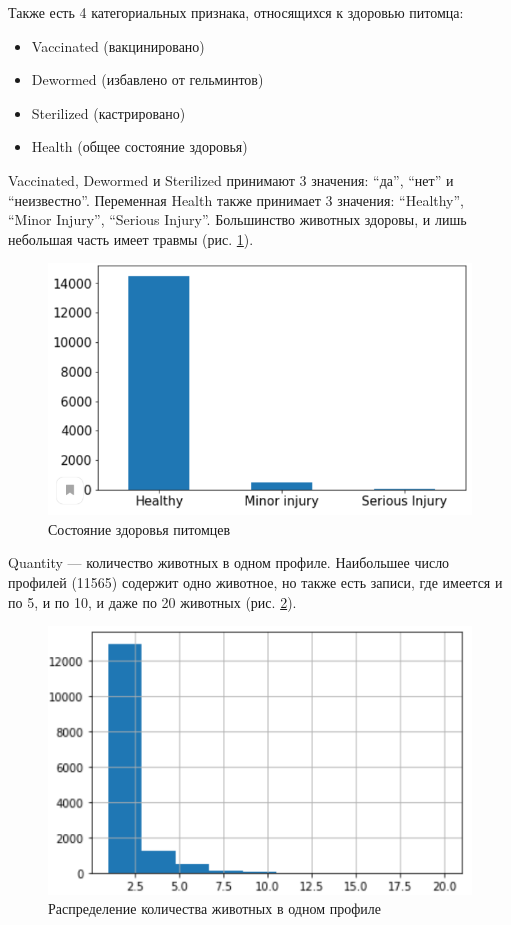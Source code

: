 \documentclass[14pt]{mmcs_article}
\begin{document}
Также есть 4 категориальных признака, относящихся к здоровью питомца: 

\begin{itemize}
	\item Vaccinated (вакцинировано)
	\item Dewormed (избавлено от гельминтов)
	\item Sterilized (кастрировано)
	\item Health (общее состояние здоровья)
\end{itemize}

Vaccinated, Dewormed и Sterilized принимают 3 значения: ``да'', ``нет'' и ``неизвестно''. Переменная Health также принимает 3 значения: ``Healthy'', ``Minor Injury'', ``Serious Injury''. Большинство животных здоровы, и лишь небольшая часть имеет травмы (рис. \ref{analyse:health}).

\begin{figure}[H]
	\centering
	\includegraphics[scale=0.9]{health.png}
	\caption{Состояние здоровья питомцев}\label{analyse:health}
\end{figure}

Quantity --- количество животных в одном профиле. Наибольшее число профилей (11565) содержит одно животное, но также есть записи, где имеется и по 5, и по 10, и даже по 20 животных (рис. \ref{analyse:count}). 

\begin{figure}[H]
	\centering
	\includegraphics[scale=1]{count.png}
	\caption{Распределение количества животных в одном профиле}\label{analyse:count}
\end{figure}
\end{document}
